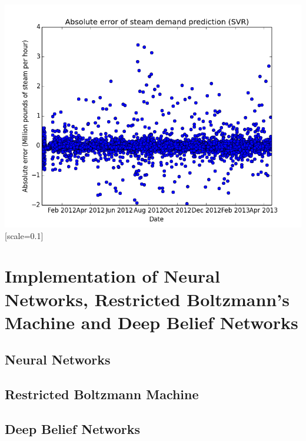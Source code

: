 \documentclass{article} %
\begin{document}
\begin{center}
\includegraphics{SVR_error}[scale=0.1]
\end{center}


\vspace{-.2cm}
\section{Implementation of Neural Networks, Restricted Boltzmann's Machine and Deep Belief Networks}
\vspace{-.2cm}

\subsection{Neural Networks}

\subsection{Restricted Boltzmann Machine}

\subsection{Deep Belief Networks}


\end{document}
